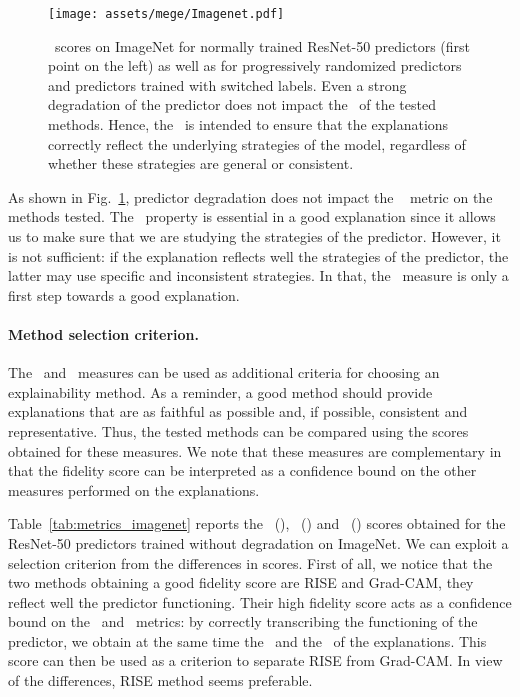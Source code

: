 \begin{figure}[ht]
    \centering
    \texttt{[image: assets/mege/Imagenet.pdf]}
    \caption{
    \fidelity~scores on ImageNet for normally trained ResNet-50 predictors (first point on the left) as well as for progressively randomized predictors and predictors trained with switched labels.
    Even a strong degradation of the predictor does not impact the \fidelity~of the tested methods. Hence, the \fidelity~is intended to ensure that the explanations correctly reflect the underlying strategies of the model, regardless of whether these strategies are general or consistent.
    }
    \label{fig:fidelity}
\end{figure}

As shown in Fig.~\ref{fig:fidelity}, predictor degradation does not impact the \fidelity~ metric on the methods tested. 
The \fidelity~property is essential in a good explanation since it allows us to make sure that we are studying the strategies of the predictor.
However, it is not sufficient: if the explanation reflects well the strategies of the predictor, the latter may use specific and inconsistent strategies. In that, the \fidelity~measure is only a first step towards a good explanation.


\paragraph{Method selection criterion.} The \mege~and \reco~measures can be used as additional criteria for choosing an explainability method.  
As a reminder, a good method should provide explanations that are as faithful as possible and, if possible, consistent and representative.
Thus, the tested methods can be compared using the scores obtained for these measures. We note that these measures are complementary in that the fidelity score can be interpreted as a confidence bound on the other measures performed on the explanations.



Table~\ref{tab:metrics_imagenet} reports the \fidelity~(\muf), \consistency~(\reco) and \representativity~(\mege) scores obtained for the ResNet-50 predictors trained without degradation on ImageNet. 
We can exploit a selection criterion from the differences in scores.
First of all, we notice that the two methods obtaining a good fidelity score are RISE and Grad-CAM, they reflect well the predictor functioning. 
Their high fidelity score acts as a confidence bound on the \mege~and \reco~metrics: by correctly transcribing the functioning of the predictor, we obtain at the same time the \representativity~and the \consistency~of the explanations.
This score can then be used as a criterion to separate RISE from Grad-CAM. In view of the differences, RISE method seems preferable.

